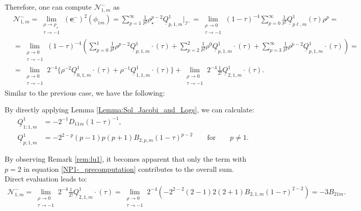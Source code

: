 Therefore, one can compute $\mathcal{N}^{-}_{1,m}$ as
\begin{align}\label{NP1-_precomputation}
  & \mathcal{N}^{-}_{1,m}= \lim_{\substack{\rho \to \rho_{\star} \\ \tau \to -1}} (\underline{\boldsymbol{e}^{-}})^2(\phi_{1m}) = \sum_{p=1}^{\infty}\frac{1}{p!}\rho_{\star}^{p-2}\underline{Q}^{1}_{p,1,m}|_{\mathscr{I}^{-}} =  \lim _{\substack{\rho \rightarrow 0 \\ \tau \rightarrow -1}}(1-\tau)^{-4} \sum_{p=0}^{\infty} \frac{1}{p !} \underline{Q}_{p \ell, m}^{1}(\tau) \rho^{p} = \nonumber \\
  & = \lim _{\substack{\rho \rightarrow 0 \\ \tau \rightarrow -1}}(1-\tau)^{-4}\left(\sum_{p=0}^{1} \frac{1}{p !} \rho^{p-2} \underline{Q}_{p; 1, m}^{1}\cdot(\tau)+\sum_{p=2}^{2} \frac{1}{p !} \rho^{0} \underline{Q}_{p, 1, m}^{1}\cdot(\tau)+\sum_{p=3}^{\infty} \frac{1}{p !} \rho^{p-2} \underline{Q}_{p, 1, m}^{1}\cdot{(\tau)}\right) = \nonumber \\
  & = \lim _{\substack{\rho \rightarrow 0 \\ \tau \rightarrow -1}} 2^{-4}\big\{\rho^{-2} \underline{Q}_{0,1, m}^{1}\cdot(\tau)+\rho^{-1} \underline{Q}_{1,1, m}^{1}\cdot(\tau)\big\}+\lim_{\substack{\rho \rightarrow 0 \\ \tau \rightarrow -1}} 2^{-4} \frac{1}{2 !} \underline{Q}^{1}_{2, 1, m}\cdot(\tau). 
\end{align}
Similar to the previous case, we have the following:
\begin{remark}\label{rem:lu1}
  By directly applying Lemma \ref{Lemma:Sol_Jacobi_and_Logs}, we can calculate: 
 \begin{align}
   \underline{Q}^{1}_{1;1,m} &=-2^{-1}D_{11m}(1-\tau)^{-1},\\
   \underline{Q}^{1}_{p;1,m} &=-2^{2-p}(p-1)p(p+1)B_{2,p,m}(1-\tau)^{p-2} \qquad
   \text{for}\qquad p\neq 1.
 \end{align}
\end{remark}
By observing Remark \ref{rem:lu1}, it becomes apparent that only the term with $p=2$ in equation \eqref{NP1-_precomputation} contributes to the overall sum. \\
Direct evaluation leads to:
\begin{align}
  \mathcal{N}^{-}_{1,m} = \lim _{\substack{\rho \rightarrow 0 \\ \tau \rightarrow -1}}2^{-4} \frac{1}{2 !} \underline{Q}^{1}_{2, 1, m}\cdot(\tau) = \lim _{\substack{\rho \rightarrow 0 \\ \tau \rightarrow -1}}2^{-4}\left(-2^{2-2}(2-1)2(2+1)B_{2,1,m}(1-\tau)^{2-2}\right) = -3B_{21m}.
\end{align}
